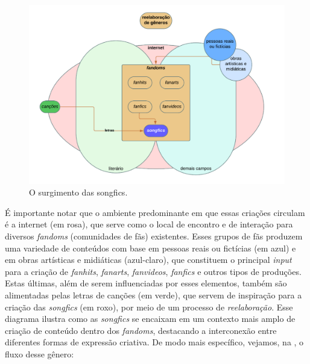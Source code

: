 \begin{figure}[htbp]
    \centering
    \begin{minipage}{.75\textwidth}
    \includegraphics[width=\textwidth]{fig01.png}
    \caption{O surgimento das songfics.}
    \label{fig-01}
    \end{minipage}
\end{figure}

É importante notar que o ambiente predominante em que essas criações
circulam é a internet (em rosa), que serve como o local de encontro e de
interação para diversos \emph{fandoms} (comunidades de fãs) existentes.
Esses grupos de fãs produzem uma variedade de conteúdos com base em
pessoas reais ou fictícias (em azul) e em obras artísticas e midiáticas
(azul-claro), que constituem o principal \emph{input} para a criação de
\emph{fanhits}, \emph{fanarts}, \emph{fanvideos}, \emph{fanfics} e
outros tipos de produções. Estas últimas, além de serem influenciadas
por esses elementos, também são alimentadas pelas letras de canções (em
verde), que servem de inspiração para a criação das \emph{songfics} (em
roxo), por meio de um processo de \emph{reelaboração}. Esse diagrama
ilustra como as \emph{songfics} se encaixam em um contexto mais amplo de
criação de conteúdo dentro dos \emph{fandoms}, destacando a interconexão
entre diferentes formas de expressão criativa. De modo mais específico,
vejamos, na , o fluxo desse gênero:


